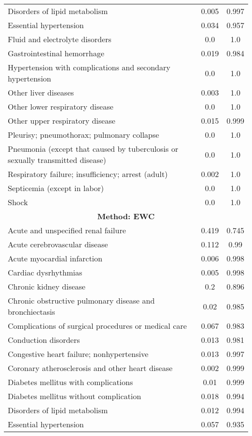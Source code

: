 \documentclass{article}
\begin{document}
\begin{longtable}{lcc}
Disorders of lipid metabolism & 0.005 & 0.997 \\
Essential hypertension & 0.034 & 0.957 \\
Fluid and electrolyte disorders & 0.0 & 1.0 \\
Gastrointestinal hemorrhage & 0.019 & 0.984 \\
Hypertension with complications and secondary hypertension & 0.0 & 1.0 \\
Other liver diseases & 0.003 & 1.0 \\
Other lower respiratory disease & 0.0 & 1.0 \\
Other upper respiratory disease & 0.015 & 0.999 \\
Pleurisy; pneumothorax; pulmonary collapse & 0.0 & 1.0 \\
Pneumonia (except that caused by tuberculosis or sexually transmitted disease) & 0.0 & 1.0 \\
Respiratory failure; insufficiency; arrest (adult) & 0.002 & 1.0 \\
Septicemia (except in labor) & 0.0 & 1.0 \\
Shock & 0.0 & 1.0 \\
\midrule
\multicolumn{3}{c}{\textbf{Method: EWC}} \\
\midrule
Acute and unspecified renal failure & 0.419 & 0.745 \\
Acute cerebrovascular disease & 0.112 & 0.99 \\
Acute myocardial infarction & 0.006 & 0.998 \\
Cardiac dysrhythmias & 0.005 & 0.998 \\
Chronic kidney disease & 0.2 & 0.896 \\
Chronic obstructive pulmonary disease and bronchiectasis & 0.02 & 0.985 \\
Complications of surgical procedures or medical care & 0.067 & 0.983 \\
Conduction disorders & 0.013 & 0.981 \\
Congestive heart failure; nonhypertensive & 0.013 & 0.997 \\
Coronary atherosclerosis and other heart disease & 0.002 & 0.999 \\
Diabetes mellitus with complications & 0.01 & 0.999 \\
Diabetes mellitus without complication & 0.018 & 0.994 \\
Disorders of lipid metabolism & 0.012 & 0.994 \\
Essential hypertension & 0.057 & 0.935 \\

\end{longtable}
\end{document}
